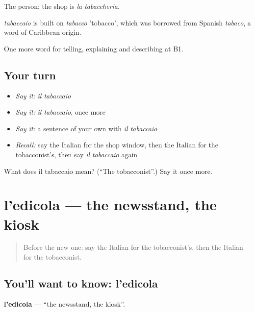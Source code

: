 The person; the shop is \emph{la tabaccheria}.

\begin{cousinweb}
\emph{tabaccaio} is built on \emph{tabacco} 'tobacco', which was borrowed from Spanish \emph{tabaco}, a word of Caribbean origin.
\end{cousinweb}

\begin{grammarlens}[title={What you've built}]
One more word for telling, explaining and describing at B1.
\end{grammarlens}

\subsection*{Your turn}
\begin{itemize}
\raggedright
  \item \emph{Say it:} \emph{il tabaccaio}
  \item \emph{Say it:} \emph{il tabaccaio}, once more
  \item \emph{Say it:} a sentence of your own with \emph{il tabaccaio}
  \item \emph{Recall:} say the Italian for the shop window, then the Italian for the tobacconist's, then say \emph{il tabaccaio} again
\end{itemize}

\begin{tcolorbox}[breakable,colback=teal!4,colframe=teal!35!black,title={Before you move on}]
What does il tabaccaio mean? (\textquotedblleft{}The tobacconist\textquotedblright{}.) Say it once more.
\end{tcolorbox}
\section[l'edicola]{l'edicola — the newsstand, the kiosk}

\label{lesson:IT-C452-edicola}



\begin{quote}
Before the new one: say the Italian for the tobacconist's, then the Italian for the tobacconist.
\end{quote}

\subsection*{You'll want to know: l'edicola}
\textbf{l'edicola} — \textquotedblleft{}the newsstand, the kiosk\textquotedblright{}.

